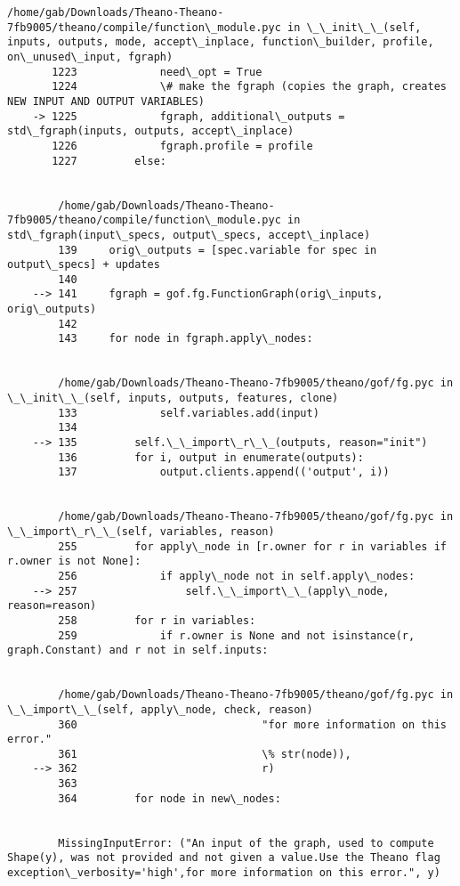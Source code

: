 \documentclass{article}
\begin{document}
\begin{Verbatim}[commandchars=\\\{\}]
        /home/gab/Downloads/Theano-Theano-7fb9005/theano/compile/function\_module.pyc in \_\_init\_\_(self, inputs, outputs, mode, accept\_inplace, function\_builder, profile, on\_unused\_input, fgraph)
       1223             need\_opt = True
       1224             \# make the fgraph (copies the graph, creates NEW INPUT AND OUTPUT VARIABLES)
    -> 1225             fgraph, additional\_outputs = std\_fgraph(inputs, outputs, accept\_inplace)
       1226             fgraph.profile = profile
       1227         else:


        /home/gab/Downloads/Theano-Theano-7fb9005/theano/compile/function\_module.pyc in std\_fgraph(input\_specs, output\_specs, accept\_inplace)
        139     orig\_outputs = [spec.variable for spec in output\_specs] + updates
        140 
    --> 141     fgraph = gof.fg.FunctionGraph(orig\_inputs, orig\_outputs)
        142 
        143     for node in fgraph.apply\_nodes:


        /home/gab/Downloads/Theano-Theano-7fb9005/theano/gof/fg.pyc in \_\_init\_\_(self, inputs, outputs, features, clone)
        133             self.variables.add(input)
        134 
    --> 135         self.\_\_import\_r\_\_(outputs, reason="init")
        136         for i, output in enumerate(outputs):
        137             output.clients.append(('output', i))


        /home/gab/Downloads/Theano-Theano-7fb9005/theano/gof/fg.pyc in \_\_import\_r\_\_(self, variables, reason)
        255         for apply\_node in [r.owner for r in variables if r.owner is not None]:
        256             if apply\_node not in self.apply\_nodes:
    --> 257                 self.\_\_import\_\_(apply\_node, reason=reason)
        258         for r in variables:
        259             if r.owner is None and not isinstance(r, graph.Constant) and r not in self.inputs:


        /home/gab/Downloads/Theano-Theano-7fb9005/theano/gof/fg.pyc in \_\_import\_\_(self, apply\_node, check, reason)
        360                             "for more information on this error."
        361                             \% str(node)),
    --> 362                             r)
        363 
        364         for node in new\_nodes:


        MissingInputError: ("An input of the graph, used to compute Shape(y), was not provided and not given a value.Use the Theano flag exception\_verbosity='high',for more information on this error.", y)

    \end{Verbatim}
\end{document}

